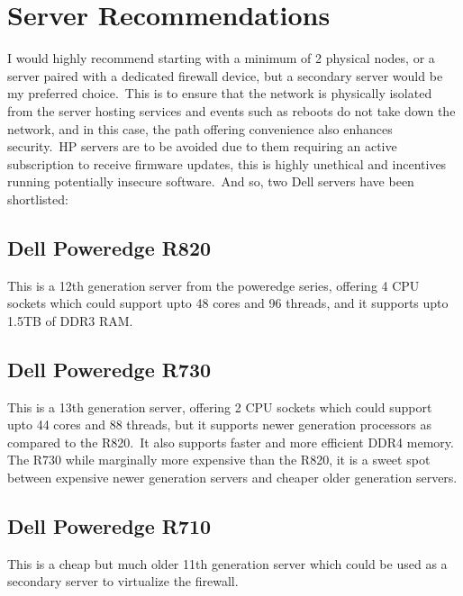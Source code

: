 \section{Server Recommendations}\label{sec:server-recommendations}
I would highly recommend starting with a minimum of 2 physical nodes, or a server paired with a dedicated firewall
device, but a secondary server would be my preferred choice.\ This is to ensure that the network is physically
isolated from the server hosting services and events such as reboots do not take down the network, and in this case,
the path offering convenience also enhances security.\ HP servers are to be avoided due to them requiring an active
subscription to receive firmware updates, this is highly unethical and incentives running potentially insecure
software.\ And so, two Dell servers have been shortlisted:


\subsection{Dell Poweredge R820}\label{subsec:dell-poweredge-r820}
This is a 12th generation server from the poweredge series, offering 4 CPU sockets which could support upto 48 cores
and 96 threads, and it supports upto 1.5TB of DDR3 RAM\@.


\subsection{Dell Poweredge R730}\label{subsec:dell-poweredge-r730}
This is a 13th generation server, offering 2 CPU sockets which could support upto 44 cores and 88 threads, but it
supports newer generation processors as compared to the R820.\ It also supports faster and more efficient DDR4 memory.
The R730 while marginally more expensive than the R820, it is a sweet spot between expensive newer generation servers
and cheaper older generation servers.


\subsection{Dell Poweredge R710}\label{subsec:dell-poweredge-r710}
This is a cheap but much older 11th generation server which could be used as a secondary server to virtualize the
firewall.


